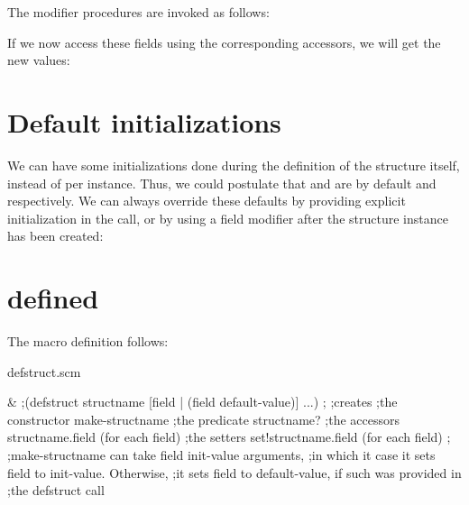 The modifier procedures are invoked as follows:


If we now access these fields using the corresponding
accessors, we will get the new values:


\section{Default initializations}

We can have some initializations done during the
definition of the structure itself, instead of per
instance.  Thus, we could postulate that 
and  are by default  and
 respectively.  We can always override these
defaults by providing explicit initialization in the
 call, or by
using a field modifier after the structure instance has
been created:


\section{ defined}

The  macro definition follows:

\scmfilename defstruct.scm

\scmwrite&
;(defstruct structname [field | (field default-value)] ...)
;
;creates
;the constructor make-structname
;the predicate structname?
;the accessors structname.field (for each field)
;the setters set!structname.field (for each field)
;
;make-structname can take {field init-value} arguments,
;in which it case it sets field to init-value.  Otherwise,
;it sets field to default-value, if such was provided in
;the defstruct call

